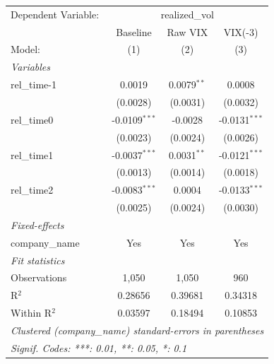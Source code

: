 
\begingroup
\centering
\begin{tabular}{lccc}
   \tabularnewline \midrule \midrule
   Dependent Variable: & \multicolumn{3}{c}{realized\_vol}\\
                  & Baseline        & Raw VIX       & VIX(-3) \\   
   Model:         & (1)             & (2)           & (3)\\  
   \midrule
   \emph{Variables}\\
   rel\_time-1    & 0.0019          & 0.0079$^{**}$ & 0.0008\\   
                  & (0.0028)        & (0.0031)      & (0.0032)\\   
   rel\_time0     & -0.0109$^{***}$ & -0.0028       & -0.0131$^{***}$\\   
                  & (0.0023)        & (0.0024)      & (0.0026)\\   
   rel\_time1     & -0.0037$^{***}$ & 0.0031$^{**}$ & -0.0121$^{***}$\\   
                  & (0.0013)        & (0.0014)      & (0.0018)\\   
   rel\_time2     & -0.0083$^{***}$ & 0.0004        & -0.0133$^{***}$\\   
                  & (0.0025)        & (0.0024)      & (0.0030)\\   
   \midrule
   \emph{Fixed-effects}\\
   company\_name  & Yes             & Yes           & Yes\\  
   \midrule
   \emph{Fit statistics}\\
   Observations   & 1,050           & 1,050         & 960\\  
   R$^2$          & 0.28656         & 0.39681       & 0.34318\\  
   Within R$^2$   & 0.03597         & 0.18494       & 0.10853\\  
   \midrule \midrule
   \multicolumn{4}{l}{\emph{Clustered (company\_name) standard-errors in parentheses}}\\
   \multicolumn{4}{l}{\emph{Signif. Codes: ***: 0.01, **: 0.05, *: 0.1}}\\
\end{tabular}
\par\endgroup


